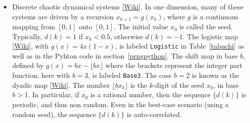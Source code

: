\documentclass[oneside,10pt]{book}
\begin{document}
\begin{itemize}
\item Discrete chaotic \textcolor{index}{dynamical systems} [\href{https://en.wikipedia.org/wiki/Dynamical_system}{Wiki}].
 In one dimension, many of these systems are driven by a recursion $x_{k+1}=g(x_k)$, where $g$ is a continuous mapping from
$[0,1]$ onto $[0,1]$. The initial value $x_0$ is called the seed. Typically, $d(k)=1$ if $x_k<0.5$, otherwise $d(k)=-1$. The \textcolor{index}{logistic map} [\href{https://en.wikipedia.org/wiki/Logistic_map}{Wiki}], with $g(x)=4x(1-x)$, is labeled \texttt{Logistic} in Table~\ref{tabuchi} as well as in the Pyhton code
 in section~\ref{prngpython}. The \textcolor{index}{shift map} in base $b$, defined by $g(x)=bx-\lfloor bx\rfloor$ where the brackets represent the integer part function, here with $b=3$, is labeled
\texttt{Base3}. The case $b=2$ is known as the
 \textcolor{index}{dyadic map} [\href{https://en.wikipedia.org/wiki/Dyadic_transformation}{Wiki}].
The number $\lfloor bx_k\rfloor$
  is the $k$-digit of the seed $x_0$, in base $b>1$. In particular, if $x_0$ is a rational number, then the sequence
$\{d(k)\}$ is periodic, and thus non random. Even in the best-case scenario (using a random seed), the sequence $\{d(k)\}$ is auto-correlated.


\end{itemize}
\end{document}
